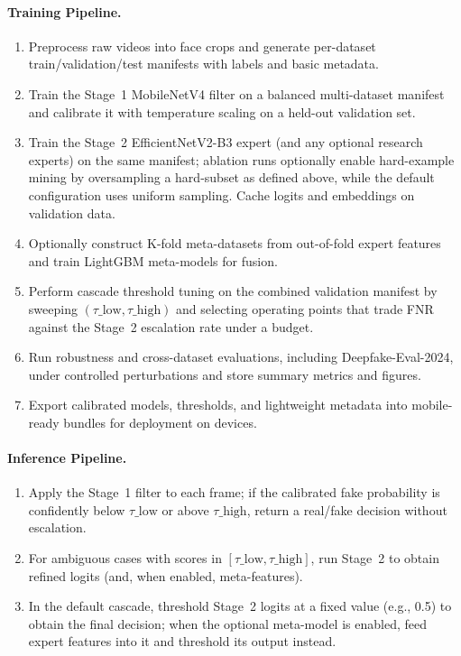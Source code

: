 \paragraph{Training Pipeline.}
\begin{enumerate}[leftmargin=*,itemsep=2pt,parsep=0pt]
  \item Preprocess raw videos into face crops and generate per\hyp dataset train/validation/test manifests with labels and basic metadata.
  \item Train the Stage~1 MobileNetV4 filter on a balanced multi\hyp dataset manifest and calibrate it with temperature scaling on a held\hyp out validation set.
  \item Train the Stage~2 EfficientNetV2\hyp B3 expert (and any optional research experts) on the same manifest; ablation runs optionally enable hard\hyp example mining by oversampling a hard\hyp subset as defined above, while the default configuration uses uniform sampling. Cache logits and embeddings on validation data.
  \item Optionally construct K\hyp fold meta\hyp datasets from out\hyp of\hyp fold expert features and train LightGBM meta\hyp models for fusion.
  \item Perform cascade threshold tuning on the combined validation manifest by sweeping $(\tau\_{\mathrm{low}},\tau\_{\mathrm{high}})$ and selecting operating points that trade FNR against the Stage~2 escalation rate under a budget.
  \item Run robustness and cross\hyp dataset evaluations, including Deepfake\hyp Eval\hyp 2024, under controlled perturbations and store summary metrics and figures.
  \item Export calibrated models, thresholds, and lightweight metadata into mobile\hyp ready bundles for deployment on devices.
\end{enumerate}

\paragraph{Inference Pipeline.}
\begin{enumerate}[leftmargin=*,itemsep=2pt,parsep=0pt]
  \item Apply the Stage~1 filter to each frame; if the calibrated fake probability is confidently below $\tau\_{\mathrm{low}}$ or above $\tau\_{\mathrm{high}}$, return a real/fake decision without escalation.
  \item For ambiguous cases with scores in $[\tau\_{\mathrm{low}},\tau\_{\mathrm{high}}]$, run Stage~2 to obtain refined logits (and, when enabled, meta\hyp features).
  \item In the default cascade, threshold Stage~2 logits at a fixed value (e.g., 0.5) to obtain the final decision; when the optional meta\hyp model is enabled, feed expert features into it and threshold its output instead.
\end{enumerate}

